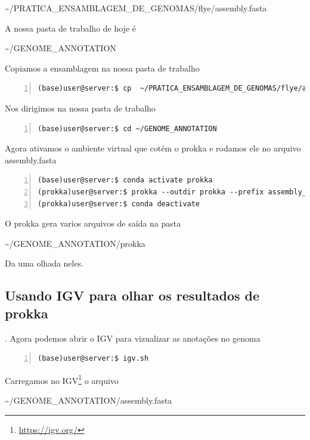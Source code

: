 \documentclass[letter,11pt]{book}
\begin{document}
\sim/PRATICA\_ENSAMBLAGEM\_DE\_GENOMAS/flye/assembly.fasta

A nossa pasta de trabalho de hoje é

\sim/GENOME\_ANNOTATION

Copiamos a ensamblagem na nossa pasta de trabalho

\begin{Verbatim}[commandchars=!\{\}, numbers=left,label= Copiando a ensamblagem para sua anotação,frame=topline,fontsize=\scriptsize]
(base)user@server:$ cp  ~/PRATICA_ENSAMBLAGEM_DE_GENOMAS/flye/assembly.fasta ~/GENOME_ANNOTATION
\end{Verbatim}

Nos dirigimos na nossa pasta de trabalho

\begin{Verbatim}[commandchars=!\{\}, numbers=left,label= Indo na pasta de trabalho,frame=topline,fontsize=\scriptsize]
(base)user@server:$ cd ~/GENOME_ANNOTATION
\end{Verbatim}

Agora ativamos o ambiente virtual que cotém o prokka e rodamos ele no arquivo assembly.fasta

\begin{Verbatim}[commandchars=!\{\}, numbers=left,label= Rodando prokka ,frame=topline,fontsize=\scriptsize]
(base)user@server:$ conda activate prokka
(prokka)user@server:$ prokka --outdir prokka --prefix assembly_pacbio assembly.fasta --force
(prokka)user@server:$ conda deactivate
\end{Verbatim}

O prokka gera varios arquivos de saída na pasta

\sim/GENOME\_ANNOTATION/prokka

Da uma olhada neles.

\subsection{Usando IGV para olhar os resultados de prokka}.
Agora podemos abrir o IGV para vizualizar as anotações no genoma
\begin{Verbatim}[commandchars=!\{\}, numbers=left,label= Abrindo IGV,frame=topline,fontsize=\scriptsize]
(base)user@server:$ igv.sh
\end{Verbatim}


Carregamos no IGV\footnote{\url{https://igv.org/}} o arquivo 



\sim/GENOME\_ANNOTATION/assembly.fasta
\end{document}
